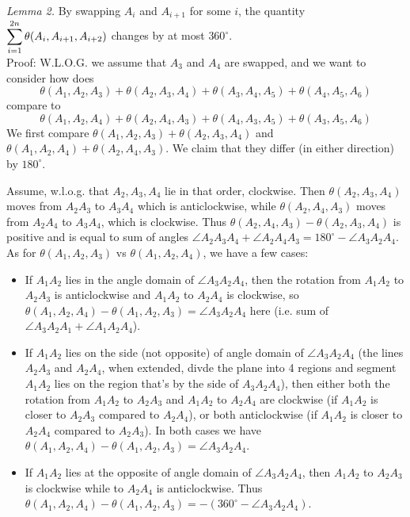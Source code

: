 \documentclass[11pt,a4paper]{article}
\begin{document}
\begin{enumerate}
	\emph{Lemma 2.} By swapping $A_i$ and $A_{i+1}$ for some $i$, the quantity $\displaystyle\sum_{i=1}^{2n}\theta(A_i, A_{i+1}, A_{i+2})$ changes by at most $360^{\circ}$. \\
	Proof: W.L.O.G. we assume that $A_3$ and $A_4$ are swapped, and we want to consider how does 
	\[
	\theta(A_1, A_2, A_3)+\theta(A_2, A_3, A_4)+\theta(A_3, A_4, A_5) + \theta (A_4, A_5, A_6)
	\]
	compare to 
	\[
	\theta(A_1, A_2, A_4)+\theta(A_2, A_4, A_3)+\theta(A_4, A_3, A_5) + \theta (A_3, A_5, A_6)
	\]
	We first compare $\theta(A_1, A_2, A_3)+\theta(A_2, A_3, A_4)$ and $\theta(A_1, A_2, A_4)+\theta(A_2, A_4, A_3)$. We claim that they differ (in either direction) by $180^{\circ}$. 
	
	Assume, w.l.o.g. that $A_2, A_3, A_4$ lie in that order, clockwise. Then $\theta(A_2, A_3, A_4)$ moves from $A_2A_3$ to $A_3A_4$ which is anticlockwise, while $\theta(A_2, A_4, A_3)$ moves from $A_2A_4$ to $A_3A_4$, which is clockwise. Thus $\theta(A_2, A_4, A_3)-\theta(A_2, A_3, A_4)$ is positive and is equal to sum of angles $\angle A_2A_3A_4+\angle A_2A_4A_3=180^{\circ} - \angle A_3A_2A_4$. 
	As for $\theta(A_1, A_2, A_3)$ vs $\theta(A_1, A_2, A_4)$, we have a few cases: 
	\begin{itemize}
		\item If $A_1A_2$ lies in the angle domain of $\angle A_3A_2A_4$, then the rotation from $A_1A_2$ to $A_2A_3$ is anticlockwise and $A_1A_2$ to $A_2A_4$ is clockwise, so $\theta(A_1, A_2, A_4)-\theta(A_1, A_2, A_3)=\angle A_3A_2A_4$ here (i.e. sum of $\angle A_3A_2A_1+\angle A_1A_2A_4$). 
		
		\item If $A_1A_2$ lies on the side (not opposite) of angle domain of $\angle A_3A_2A_4$ (the lines $A_2A_3$ and $A_2A_4$, when extended, divde the plane into 4 regions and segment $A_1A_2$ lies on the region that's by the side of $A_3A_2A_4$), then either both the rotation from $A_1A_2$ to $A_2A_3$ and $A_1A_2$ to $A_2A_4$ are clockwise (if $A_1A_2$ is closer to $A_2A_3$ compared to $A_2A_4$), or both anticlockwise (if $A_1A_2$ is closer to $A_2A_4$ compared to $A_2A_3$). In both cases we have $\theta(A_1, A_2, A_4)-\theta(A_1, A_2, A_3)=\angle A_3A_2A_4$. 
		
		\item If $A_1A_2$ lies at the opposite of angle domain of $\angle A_3A_2A_4$, then $A_1A_2$ to $A_2A_3$ is clockwise while to $A_2A_4$ is anticlockwise. Thus $\theta(A_1, A_2, A_4)-\theta(A_1, A_2, A_3)=-(360^{\circ} - \angle A_3A_2A_4)$. 
	\end{itemize}
	

\end{enumerate}
\end{document}
